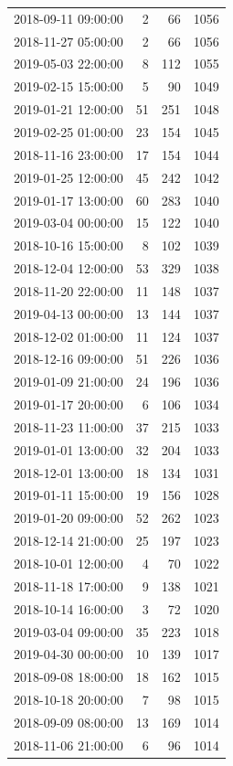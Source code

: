 \begin{tabular}{lrrr}
2018-09-11 09:00:00 & 2 & 66 & 1056 \\
2018-11-27 05:00:00 & 2 & 66 & 1056 \\
2019-05-03 22:00:00 & 8 & 112 & 1055 \\
2019-02-15 15:00:00 & 5 & 90 & 1049 \\
2019-01-21 12:00:00 & 51 & 251 & 1048 \\
2019-02-25 01:00:00 & 23 & 154 & 1045 \\
2018-11-16 23:00:00 & 17 & 154 & 1044 \\
2019-01-25 12:00:00 & 45 & 242 & 1042 \\
2019-01-17 13:00:00 & 60 & 283 & 1040 \\
2019-03-04 00:00:00 & 15 & 122 & 1040 \\
2018-10-16 15:00:00 & 8 & 102 & 1039 \\
2018-12-04 12:00:00 & 53 & 329 & 1038 \\
2018-11-20 22:00:00 & 11 & 148 & 1037 \\
2019-04-13 00:00:00 & 13 & 144 & 1037 \\
2018-12-02 01:00:00 & 11 & 124 & 1037 \\
2018-12-16 09:00:00 & 51 & 226 & 1036 \\
2019-01-09 21:00:00 & 24 & 196 & 1036 \\
2019-01-17 20:00:00 & 6 & 106 & 1034 \\
2018-11-23 11:00:00 & 37 & 215 & 1033 \\
2019-01-01 13:00:00 & 32 & 204 & 1033 \\
2018-12-01 13:00:00 & 18 & 134 & 1031 \\
2019-01-11 15:00:00 & 19 & 156 & 1028 \\
2019-01-20 09:00:00 & 52 & 262 & 1023 \\
2018-12-14 21:00:00 & 25 & 197 & 1023 \\
2018-10-01 12:00:00 & 4 & 70 & 1022 \\
2018-11-18 17:00:00 & 9 & 138 & 1021 \\
2018-10-14 16:00:00 & 3 & 72 & 1020 \\
2019-03-04 09:00:00 & 35 & 223 & 1018 \\
2019-04-30 00:00:00 & 10 & 139 & 1017 \\
2018-09-08 18:00:00 & 18 & 162 & 1015 \\
2018-10-18 20:00:00 & 7 & 98 & 1015 \\
2018-09-09 08:00:00 & 13 & 169 & 1014 \\
2018-11-06 21:00:00 & 6 & 96 & 1014 \\

\end{tabular}
